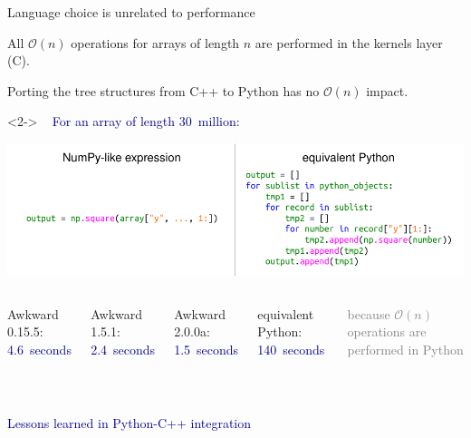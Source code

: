 \documentclass[aspectratio=169]{beamer}
\begin{document}
\begin{frame}{Language choice is unrelated to performance}
\large

\vspace{0.25 cm}
All $\mathcal{O}(n)$ operations for arrays of length $n$ are performed in the kernels layer (C).

\vspace{0.15 cm}
Porting the tree structures from C++ to Python has no $\mathcal{O}(n)$ impact.

\vspace{0.15 cm}
\begin{uncoverenv}<2->
\mbox{ } \hfill \textcolor{darkblue}{For an array of length 30~million:} \hfill \mbox{ }

\includegraphics[width=\linewidth]{numpy-like-vs-equivalent-python.pdf}

\vspace{0.25 cm}
\begin{columns}
Awkward 0.15.5: \hfill\textcolor{darkblue}{4.6~seconds}

Awkward 1.5.1: \hfill\textcolor{darkblue}{2.4~seconds}

Awkward 2.0.0a: \hfill\textcolor{darkblue}{1.5~seconds}

equivalent Python: \textcolor{darkblue}{140~seconds}

\textcolor{gray}{because $\mathcal{O}(n)$ operations are performed in Python}
\end{columns}
\end{uncoverenv}
\end{frame}

\begin{frame}{\mbox{ }}
\LARGE
\begin{center}
\textcolor{darkblue}{Lessons learned in Python-C++ integration}
\end{center}
\end{frame}
\end{document}
